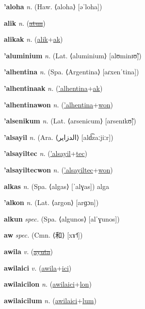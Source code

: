 \textbf{\hypertarget{'aloha}{'aloha}} \textit{n.} (Haw. ⟨aloha⟩ [əˈloha])


\textbf{\hypertarget{alik}{alik}} \textit{n.} (\hyperlink{atun}{\sout{atun}})


\textbf{\hypertarget{alikak}{alikak}} \textit{n.} (\hyperlink{alik}{alik}+\allowbreak \hyperlink{ak}{ak})


\textbf{\hypertarget{'aluminium}{'aluminium}} \textit{n.} (Lat. ⟨aluminium⟩ [alʊminɪʊ̃])


\textbf{\hypertarget{'alhentina}{'alhentina}} \textit{n.} (Spa. ⟨Argentina⟩ [aɾxenˈtina])


\textbf{\hypertarget{'alhentinaak}{'alhentinaak}} \textit{n.} (\hyperlink{'alhentina}{'alhentina}+\allowbreak \hyperlink{ak}{ak})


\textbf{\hypertarget{'alhentinawon}{'alhentinawon}} \textit{n.} (\hyperlink{'alhentina}{'alhentina}+\allowbreak \hyperlink{won}{won})


\textbf{\hypertarget{'alsenikum}{'alsenikum}} \textit{n.} (Lat. ⟨arsenicum⟩ [arsenɪkʊ̃])


\textbf{\hypertarget{'alsayil}{'alsayil}} \textit{n.} (Ara. ⟨{\arabics{}الدزاير}⟩ [ald͡zaːjiːr])


\textbf{\hypertarget{'alsayiltec}{'alsayiltec}} \textit{n.} (\hyperlink{'alsayil}{'alsayil}+\allowbreak \hyperlink{tec}{tec})


\textbf{\hypertarget{'alsayiltecwon}{'alsayiltecwon}} \textit{n.} (\hyperlink{'alsayiltec}{'alsayiltec}+\allowbreak \hyperlink{won}{won})


\textbf{\hypertarget{alkas}{alkas}} \textit{n.} (Spa. ⟨algas⟩ [ˈalɣas])
alga

\textbf{\hypertarget{'alkon}{'alkon}} \textit{n.} (Lat. ⟨argon⟩ [arɡɔn])


\textbf{\hypertarget{alkun}{alkun}} \textit{spec.} (Spa. ⟨algunos⟩ [alˈɣunos])


\textbf{\hypertarget{aw}{aw}} \textit{spec.} (Cmn. ⟨{\chinese{}和}⟩ [xɤ˧˥])


\textbf{\hypertarget{awila}{awila}} \textit{v.} (\hyperlink{ayuta}{\sout{ayuta}})


\textbf{\hypertarget{awilaici}{awilaici}} \textit{v.} (\hyperlink{awila}{awila}+\allowbreak \hyperlink{ici}{ici})


\textbf{\hypertarget{awilaicilon}{awilaicilon}} \textit{n.} (\hyperlink{awilaici}{awilaici}+\allowbreak \hyperlink{lon}{lon})


\textbf{\hypertarget{awilaicilum}{awilaicilum}} \textit{n.} (\hyperlink{awilaici}{awilaici}+\allowbreak \hyperlink{lum}{lum})


